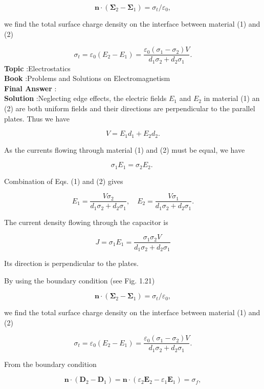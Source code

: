 \documentclass[10pt]{article}
\begin{document}
$$
\mathbf{n} \cdot\left(\boldsymbol{\Sigma}_{2}-\boldsymbol{\Sigma}_{1}\right)=\sigma_{t} / \varepsilon_{0},
$$

we find the total surface charge density on the interface between material (1) and (2)

$$
\sigma_{t}=\varepsilon_{0}\left(E_{2}-E_{1}\right)=\frac{\varepsilon_{0}\left(\sigma_{1}-\sigma_{2}\right) V}{d_{1} \sigma_{2}+d_{2} \sigma_{1}} .
$$
\textbf{Topic} :Electrostatics\\
\textbf{Book} :Problems and Solutions on Electromagnetism\\
\textbf{Final Answer} :\\


\textbf{Solution} :Neglecting edge effects, the electric fields $E_{1}$ and $E_{2}$ in material (1) an (2) are both uniform fields and their directions are perpendicular to the parallel plates. Thus we have

$$
V=E_{1} d_{1}+E_{2} d_{2} .
$$

As the currents flowing through material (1) and (2) must be equal, we have

$$
\sigma_{1} E_{1}=\sigma_{2} E_{2} \text {. }
$$

Combination of Eqs.
(1) and (2) gives

$$
E_{1}=\frac{V \sigma_{2}}{d_{1} \sigma_{2}+d_{2} \sigma_{1}}, \quad E_{2}=\frac{V \sigma_{1}}{d_{1} \sigma_{2}+d_{2} \sigma_{1}} .
$$

 The current density flowing through the capacitor is

$$
J=\sigma_{1} E_{1}=\frac{\sigma_{1} \sigma_{2} V}{d_{1} \sigma_{2}+d_{2} \sigma_{1}}
$$

Its direction is perpendicular to the plates.

 By using the boundary condition (see Fig. 1.21)

$$
\mathbf{n} \cdot\left(\boldsymbol{\Sigma}_{2}-\boldsymbol{\Sigma}_{1}\right)=\sigma_{t} / \varepsilon_{0},
$$

we find the total surface charge density on the interface between material (1) and (2)

$$
\sigma_{t}=\varepsilon_{0}\left(E_{2}-E_{1}\right)=\frac{\varepsilon_{0}\left(\sigma_{1}-\sigma_{2}\right) V}{d_{1} \sigma_{2}+d_{2} \sigma_{1}} .
$$

 From the boundary condition

$$
\mathbf{n} \cdot\left(\mathbf{D}_{2}-\mathbf{D}_{1}\right)=\mathbf{n} \cdot\left(\varepsilon_{2} \mathbf{E}_{2}-\varepsilon_{1} \mathbf{E}_{1}\right)=\sigma_{f},
$$
\end{document}
